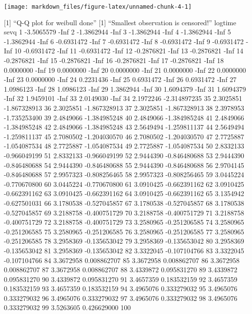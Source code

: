 \documentclass[
]{article}
\begin{document}
\begin{center}\texttt{[image: markdown\_files/figure-latex/unnamed-chunk-4-1]} \end{center}

{[}1{]} ``Q-Q plot for weibull done'' {[}1{]} ``Smallest observation is
censored!'' logtime sevq 1 -3.5065579 -Inf 2 -1.3862944 -Inf 3
-1.3862944 -Inf 4 -1.3862944 -Inf 5 -1.3862944 -Inf 6 -0.6931472 -Inf 7
-0.6931472 -Inf 8 -0.6931472 -Inf 9 -0.6931472 -Inf 10 -0.6931472 -Inf
11 -0.6931472 -Inf 12 -0.2876821 -Inf 13 -0.2876821 -Inf 14 -0.2876821
-Inf 15 -0.2876821 -Inf 16 -0.2876821 -Inf 17 -0.2876821 -Inf 18
0.0000000 -Inf 19 0.0000000 -Inf 20 0.0000000 -Inf 21 0.0000000 -Inf 22
0.0000000 -Inf 23 0.0000000 -Inf 24 0.2231436 -Inf 25 0.6931472 -Inf 26
0.6931472 -Inf 27 1.0986123 -Inf 28 1.0986123 -Inf 29 1.3862944 -Inf 30
1.6094379 -Inf 31 1.6094379 -Inf 32 1.9459101 -Inf 33 2.0149030 -Inf 34
2.1972246 -2.314897235 35 2.3025851 -1.867328913 36 2.3025851
-1.867328913 37 2.3025851 -1.867328913 38 2.3978953 -1.735253400 39
2.4849066 -1.384985248 40 2.4849066 -1.384985248 41 2.4849066
-1.384985248 42 2.4849066 -1.384985248 43 2.5649494 -1.259811137 44
2.5649494 -1.259811137 45 2.7080502 -1.204030570 46 2.7080502
-1.204030570 47 2.7725887 -1.054087534 48 2.7725887 -1.054087534 49
2.7725887 -1.054087534 50 2.8332133 -0.966049199 51 2.8332133
-0.966049199 52 2.9444390 -0.846480688 53 2.9444390 -0.846480688 54
2.9444390 -0.846480688 55 2.9444390 -0.846480688 56 2.9704145
-0.846480688 57 2.9957323 -0.808256465 58 2.9957323 -0.808256465 59
3.0445224 -0.770670800 60 3.0445224 -0.770670800 61 3.0910425
-0.662391162 62 3.0910425 -0.662391162 63 3.0910425 -0.662391162 64
3.0910425 -0.662391162 65 3.1354942 -0.627501031 66 3.1780538
-0.527045857 67 3.1780538 -0.527045857 68 3.1780538 -0.527045857 69
3.2188758 -0.400751729 70 3.2188758 -0.400751729 71 3.2188758
-0.400751729 72 3.2188758 -0.400751729 73 3.2580965 -0.251206585 74
3.2580965 -0.251206585 75 3.2580965 -0.251206585 76 3.2580965
-0.251206585 77 3.2580965 -0.251206585 78 3.2958369 -0.135653042 79
3.2958369 -0.135653042 80 3.2958369 -0.135653042 81 3.2958369
-0.135653042 82 3.3322045 -0.107104766 83 3.3322045 -0.107104766 84
3.3672958 0.008862707 85 3.3672958 0.008862707 86 3.3672958 0.008862707
87 3.3672958 0.008862707 88 3.4339872 0.095831270 89 3.4339872
0.095831270 90 3.4339872 0.095831270 91 3.4657359 0.183532159 92
3.4657359 0.183532159 93 3.4657359 0.183532159 94 3.4965076 0.333279032
95 3.4965076 0.333279032 96 3.4965076 0.333279032 97 3.4965076
0.333279032 98 3.4965076 0.333279032 99 3.5263605 0.426629000 100
\end{document}
